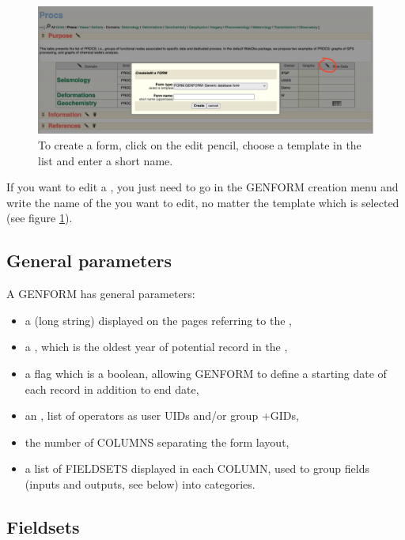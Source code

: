 \begin{figure}[!h]
	\centering
	\includegraphics[width=\textwidth]{figures/GENFORM_creation.png}
	\caption{To create a form, click on the edit pencil, choose a template in the list and enter a short name.}
	\label{GENFORM_creation}
\end{figure}

If you want to edit a , you just need to go in the GENFORM creation menu and write the name of the  you want to edit, no matter the template which is selected (see figure \ref{GENFORM_creation}).


\subsection{General parameters}


A GENFORM  has general parameters:
\begin{itemize}
	\item a  (long string) displayed on the pages referring to the ,
	\item a , which is the oldest year of potential record in the ,
	\item a  flag which is a boolean, allowing GENFORM to define a starting date of each record in addition to end date,
	\item an , list of operators as user UIDs and/or group +GIDs,
	\item the number of COLUMNS separating the form layout,
	\item a list of FIELDSETS displayed in each COLUMN, used to group fields (inputs and outputs, see below) into categories.
\end{itemize}

\subsection{Fieldsets}

